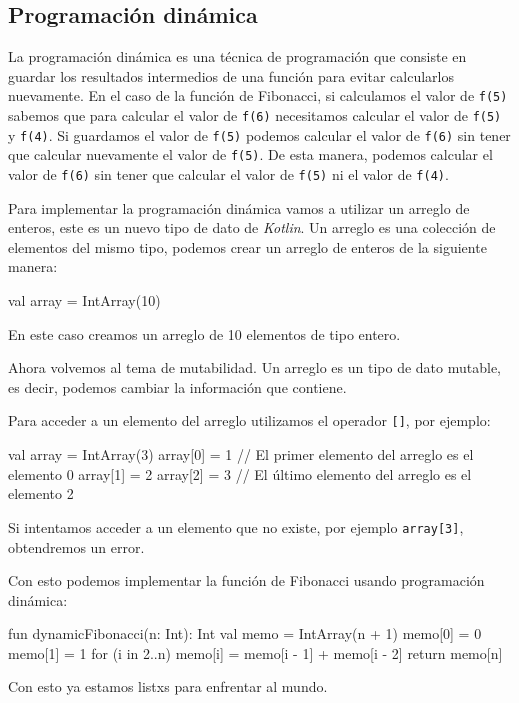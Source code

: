 \subsection{Programación dinámica}
  La programación dinámica es una técnica de programación que consiste en guardar los resultados
  intermedios de una función para evitar calcularlos nuevamente.
  En el caso de la función de Fibonacci, si calculamos el valor de \texttt{f(5)} sabemos que para
  calcular el valor de \texttt{f(6)} necesitamos calcular el valor de \texttt{f(5)} y \texttt{f(4)}.
  Si guardamos el valor de \texttt{f(5)} podemos calcular el valor de \texttt{f(6)} sin tener que
  calcular nuevamente el valor de \texttt{f(5)}.
  De esta manera, podemos calcular el valor de \texttt{f(6)} sin tener que calcular el valor de
  \texttt{f(5)} ni el valor de \texttt{f(4)}.
  
  Para implementar la programación dinámica vamos a utilizar un arreglo de enteros, este es un nuevo
  tipo de dato de \textit{Kotlin}.
  Un arreglo es una colección de elementos del mismo tipo, podemos crear un arreglo de enteros de la
  siguiente manera:
  
  \begin{kotlin}
    val array = IntArray(10)
  \end{kotlin}

  En este caso creamos un arreglo de 10 elementos de tipo entero.

  Ahora volvemos al tema de mutabilidad.
  Un arreglo es un tipo de dato mutable, es decir, podemos cambiar la información que contiene.

  Para acceder a un elemento del arreglo utilizamos el operador \texttt{[]}, por ejemplo:

  \begin{kotlin}
    val array = IntArray(3)
    array[0] = 1  // El primer elemento del arreglo es el elemento 0
    array[1] = 2
    array[2] = 3  // El último elemento del arreglo es el elemento 2
  \end{kotlin}

  Si intentamos acceder a un elemento que no existe, por ejemplo \texttt{array[3]}, obtendremos un
  error.

  Con esto podemos implementar la función de Fibonacci usando programación dinámica:

  \begin{kotlin}
    fun dynamicFibonacci(n: Int): Int {
      val memo = IntArray(n + 1)
      memo[0] = 0
      memo[1] = 1
      for (i in 2..n) {
        memo[i] = memo[i - 1] + memo[i - 2]
      }
      return memo[n]
    }
  \end{kotlin}

  Con esto ya estamos listxs para enfrentar al mundo.
